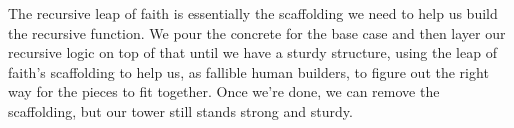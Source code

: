 \begin{meta}
The recursive leap of faith is essentially the scaffolding we need to help us build the recursive function. We pour the concrete for the base case and then layer our recursive logic on top of that until we have a sturdy structure, using the leap of faith's scaffolding to help us, as fallible human builders, to figure out the right way for the pieces to fit together. Once we're done, we can remove the scaffolding, but our tower still stands strong and sturdy. 


\end{meta}
